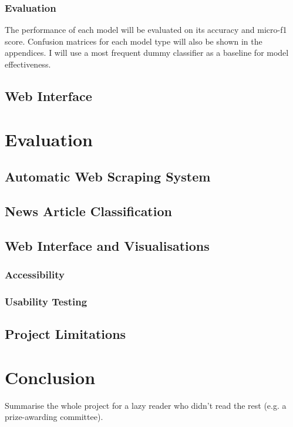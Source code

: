 \documentclass{l4proj}
\begin{document}
\subsection{Evaluation}
The performance of each model will be evaluated on its accuracy and micro-f1 score. Confusion matrices for each model type will also be shown in the appendices. I will use a most frequent dummy classifier as a baseline for model effectiveness.

\section{Web Interface}
\chapter{Evaluation}
\section{Automatic Web Scraping System}
\section{News Article Classification}
\section{Web Interface and Visualisations}
\subsection{Accessibility}
\subsection{Usability Testing}
\section{Project Limitations} 

\chapter{Conclusion}    
Summarise the whole project for a lazy reader who didn't read the rest (e.g. a prize-awarding committee).
\end{document}
